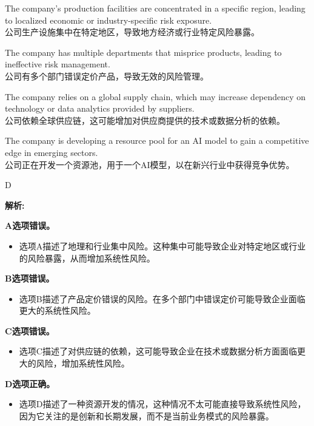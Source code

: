 \documentclass{article}
\newenvironment{explanation}
{\textbf{解析:}\par}
{\par}
\begin{document}
        \begin{choices}
            \item The company's production facilities are concentrated in a specific region, leading to localized economic or industry-specific risk exposure.  \\
            公司生产设施集中在特定地区，导致地方经济或行业特定风险暴露。
            \item The company has multiple departments that misprice products, leading to ineffective risk management.  \\
            公司有多个部门错误定价产品，导致无效的风险管理。
            \item The company relies on a global supply chain, which may increase dependency on technology or data analytics provided by suppliers.  \\
            公司依赖全球供应链，这可能增加对供应商提供的技术或数据分析的依赖。
            \item The company is developing a resource pool for an AI model to gain a competitive edge in emerging sectors.  \\
            公司正在开发一个资源池，用于一个AI模型，以在新兴行业中获得竞争优势。
        \end{choices}
        
        \begin{correctanswer}
        D
        \end{correctanswer}
        
        \begin{explanation}
            \textbf{A选项错误。}
            \begin{itemize}
                \item 选项A描述了地理和行业集中风险。这种集中可能导致企业对特定地区或行业的风险暴露，从而增加系统性风险。
            \end{itemize}
        
            \textbf{B选项错误。}
            \begin{itemize}
                \item 选项B描述了产品定价错误的风险。在多个部门中错误定价可能导致企业面临更大的系统性风险。
            \end{itemize}
        
            \textbf{C选项错误。}
            \begin{itemize}
                \item 选项C描述了对供应链的依赖，这可能导致企业在技术或数据分析方面面临更大的风险，增加系统性风险。
            \end{itemize}
        
            \textbf{D选项正确。}
            \begin{itemize}
                \item 选项D描述了一种资源开发的情况，这种情况不太可能直接导致系统性风险，因为它关注的是创新和长期发展，而不是当前业务模式的风险暴露。
            \end{itemize}
        \end{explanation}
        
\end{document}
